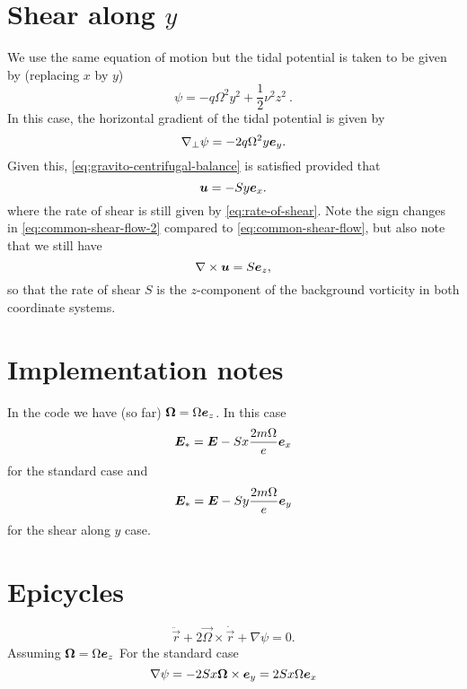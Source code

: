\documentclass[aps,pre,notitlepage,amsmath,amssymb,amsfonts,nobibnotes,nofootinbib,superscriptaddress,onecolumn,a4paper,10pt]{revtex4-1}
\begin{document}
\section{Shear along $y$}
We use the same equation of motion but the tidal potential is taken to be
given by (replacing $x$ by $y$)
\begin{equation}
  \psi = -q\Omega^2 y^2 + \frac{1}{2}\nu^2 z^2  \ .
\end{equation}
In this case, the horizontal gradient of the tidal potential is given by
\begin{equation}
   \nabla_\perp\psi = -2q\Omega^2 y\bm{e}_y.
\end{equation}
Given this, \cref{eq:gravito-centrifugal-balance} is satisfied provided that
\begin{equation}
  \label{eq:common-shear-flow-2}
  \bm{u} = -Sy\bm{e}_x.
\end{equation}
where the rate of shear is still given by \cref{eq:rate-of-shear}.
Note the sign changes in \cref{eq:common-shear-flow-2} compared to
\cref{eq:common-shear-flow}, but also note that we still have
\begin{equation}
  \nabla\times\bm{u} = S\bm{e}_z,
\end{equation}
so that the rate of shear $S$ is the $z$-component of the background vorticity
in both coordinate systems.

\section{Implementation notes}
In the code we have (so far) $\bm{\Omega} = \Omega \bm{e}_z$. In this case
\begin{equation}
  \bm{E}_\ast = \bm{E} - Sx \frac{2m\Omega}{e} \bm{e}_x
\end{equation}
for the standard case and
\begin{equation}
  \bm{E}_\ast = \bm{E} - Sy \frac{2m\Omega}{e} \bm{e}_y
\end{equation}
for the shear along $y$ case.

\section{Epicycles}
\begin{equation}
  \ddot{\vec{r}} + 2\vec{\Omega}\times\dot{\vec{r}} + \nabla\psi = 0.
\end{equation}
Assuming $\bm{\Omega} = \Omega \bm{e}_z$
For the standard case
\begin{equation}
\nabla \psi = -2Sx\bm{\Omega}\times \bm{e}_y = 2Sx\Omega \bm{e}_x
\end{equation}
\end{document}
